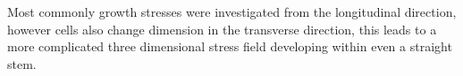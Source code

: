 Most commonly growth stresses were investigated from the longitudinal direction,
however cells also change dimension in the transverse direction, this leads to a
more complicated three dimensional stress field developing within even a
straight stem.